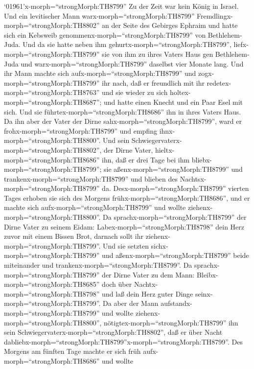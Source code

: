  `01961'\textbar x-morph=``strongMorph:TH8799'' Zu der Zeit
war kein König in Israel. Und ein levitischer Mann
warx-morph=``strongMorph:TH8799''
Fremdlingx-morph=``strongMorph:TH8802'' an der Seite des Gebirges
Ephraim und hatte sich ein Kebsweib
genommenx-morph=``strongMorph:TH8799'' von Bethlehem-Juda. 
Und da sie hatte neben ihm gehurtx-morph=``strongMorph:TH8799'',
liefx-morph=``strongMorph:TH8799'' sie von ihm zu ihres Vaters Haus gen
Bethlehem-Juda und warx-morph=``strongMorph:TH8799'' daselbst vier
Monate lang.  Und ihr Mann machte sich
aufx-morph=``strongMorph:TH8799'' und zogx-morph=``strongMorph:TH8799''
ihr nach, daß er freundlich mit ihr redetex-morph=``strongMorph:TH8763''
und sie wieder zu sich holtex-morph=``strongMorph:TH8687''; und hatte
einen Knecht und ein Paar Esel mit sich. Und sie
führtex-morph=``strongMorph:TH8686'' ihn in ihres Vaters Haus. Da ihn
aber der Vater der Dirne sahx-morph=``strongMorph:TH8799'', ward er
frohx-morph=``strongMorph:TH8799'' und empfing
ihnx-morph=``strongMorph:TH8800''.  Und sein
Schwiegervaterx-morph=``strongMorph:TH8802'', der Dirne Vater,
hieltx-morph=``strongMorph:TH8686'' ihn, daß er drei Tage bei ihm
bliebx-morph=``strongMorph:TH8799''; sie
aßenx-morph=``strongMorph:TH8799'' und
trankenx-morph=``strongMorph:TH8799'' und blieben des
Nachtsx-morph=``strongMorph:TH8799'' da. 
Desx-morph=``strongMorph:TH8799'' vierten Tages erhoben sie sich des
Morgens frühx-morph=``strongMorph:TH8686'', und er machte sich
aufx-morph=``strongMorph:TH8799'' und wollte
ziehenx-morph=``strongMorph:TH8800''. Da
sprachx-morph=``strongMorph:TH8799'' der Dirne Vater zu seinem Eidam:
Labex-morph=``strongMorph:TH8798'' dein Herz zuvor mit einem Bissen
Brot, darnach sollt ihr ziehenx-morph=``strongMorph:TH8799''.
 Und sie setzten sichx-morph=``strongMorph:TH8799'' und
aßenx-morph=``strongMorph:TH8799'' beide miteinander und
trankenx-morph=``strongMorph:TH8799''. Da
sprachx-morph=``strongMorph:TH8799'' der Dirne Vater zu dem Mann:
Bleibx-morph=``strongMorph:TH8685'' doch über
Nachtx-morph=``strongMorph:TH8798'' und laß dein Herz guter Dinge
seinx-morph=``strongMorph:TH8799''.  Da aber der Mann
aufstandx-morph=``strongMorph:TH8799'' und wollte
ziehenx-morph=``strongMorph:TH8800'',
nötigtex-morph=``strongMorph:TH8799'' ihn sein
Schwiegervaterx-morph=``strongMorph:TH8802'', daß er über Nacht
dabliebx-morph=``strongMorph:TH8799''x-morph=``strongMorph:TH8799''.
 Des Morgens am fünften Tage machte er sich früh
aufx-morph=``strongMorph:TH8686'' und wollte
